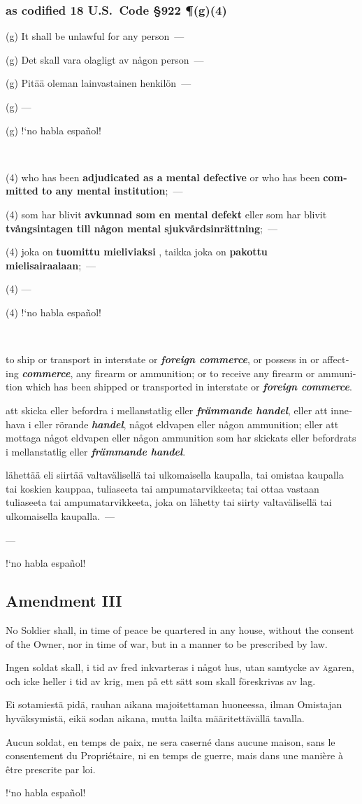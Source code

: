 \documentclass[a4paper,landscape,10pt]{article}
\newcommand{\tblock}[5]{\noindent\begin{minipage}[t]{0.18\textwidth}\foreignlanguage{english}{#1}\end{minipage}\hskip 0.025\textwidth\begin{minipage}[t]{0.18\textwidth}\foreignlanguage{swedish}{#2}\end{minipage}\hskip 0.025\textwidth\begin{minipage}[t]{0.18\textwidth}\foreignlanguage{finnish}{#3}\end{minipage}\hskip 0.025\textwidth\begin{minipage}[t]{0.18\textwidth}\foreignlanguage{french}{#4}\end{minipage}\hskip 0.025\textwidth\begin{minipage}[t]{0.18\textwidth}\foreignlanguage{spanish}{#5}\end{minipage}}
\begin{document}
\subsubsection*{as codified 18 U.S.~Code \S 922 \P(g)(4)}


\tblock
{(g) It shall be unlawful for any person~---}
{(g) Det skall vara olagligt av någon person~---}
{(g) Pitää oleman lainvastainen henkilön~---}
{(g) ---}
{(g) !`no habla español!}

~

\tblock
{(4) who has been \textbf{adjudicated as a mental defective} or who has been \textbf{committed to any mental institution};~---}
{(4) som har blivit \textbf{avkunnad som en mental defekt} eller som har blivit \textbf{tvångsintagen till någon mental sjukvårdsinrättning};~---}
{(4) joka on \textbf{tuomittu mieliviaksi} \cite{l2015}, taikka joka on \textbf{pakottu mielisairaalaan};~---}
{(4) ---}
{(4) !`no habla español!}

~

\tblock
{to ship or transport in interstate or \textbf{\textit{foreign commerce}}, or possess in or affecting \textbf{\textit{commerce}}, any firearm or ammunition; or to receive any firearm or ammunition which has been shipped or transported in interstate or \textbf{\textit{foreign commerce}}.}
{att skicka eller befordra i mellanstatlig eller \textbf{\textit{främmande handel}}, eller att innehava i eller rörande \textbf{\textit{handel}}, något eldvapen eller någon ammunition; eller att mottaga något eldvapen eller någon ammunition som har skickats eller befordrats i mellanstatlig eller \textbf{\textit{främmande handel}}.}
{lähettää eli siirtää valtavälisellä tai ulkomaisella kaupalla, tai omistaa kaupalla tai koskien kauppaa, tuliaseeta tai ampumatarvikkeeta; tai ottaa vastaan tuliaseeta tai ampumatarvikkeeta, joka on lähetty tai siirty valtavälisellä tai ulkomaisella kaupalla.~---}
{---}
{!`no habla español!}

\color{black}
\subsection*{Amendment III}
\tblock
{No Soldier shall, in time of peace be quartered in any house, without the consent of the Owner, nor in time of war, but in a manner to be prescribed by law.}
{Ingen soldat skall, i tid av fred inkvarteras i något hus, utan samtycke av \textsc{ä}garen, och icke heller i tid av krig, men på ett sätt som skall föreskrivas av lag.}
{Ei sotamiestä pidä, rauhan aikana majoitettaman huoneessa, ilman Omistajan hyväksymistä, eikä sodan aikana, mutta lailta määritettävällä tavalla.}
{Aucun soldat, en temps de paix, ne sera caserné dans aucune maison, sans le consentement du Propriétaire, ni en temps de guerre, mais dans une manière à être prescrite par loi.}
{!`no habla español!}
\end{document}
